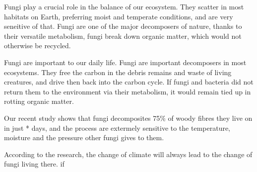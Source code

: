 \documentclass[12pt]{article}
\begin{document}
Fungi play a crucial role in the balance of  our ecosystem. They scatter in most habitats on Earth, preferring moist and temperate conditions, and are very seneitive of that. Fungi are one of the major decomposers of nature, thanks to their versatile metabolism, fungi break down organic matter, which would not otherwise be recycled.

Fungi are important to our daily life. Fungi are important decomposers in most ecosystems. They free the carbon in the debris remains and waste of living creatures, and drive then back into the carbon cycle.
If fungi and bacteria did not return them to the environment via their metabolism, it would remain tied up in rotting organic matter.

Our recent study shows that fungi    decomposites 75\% of woody fibres they live on in just * days, and the process are extermely sensitive to the temperature, moisture and the pressure other fungi gives to them. 

According to the research, the change of climate will always lead to the change of fungi living there. if 
\end{document}
